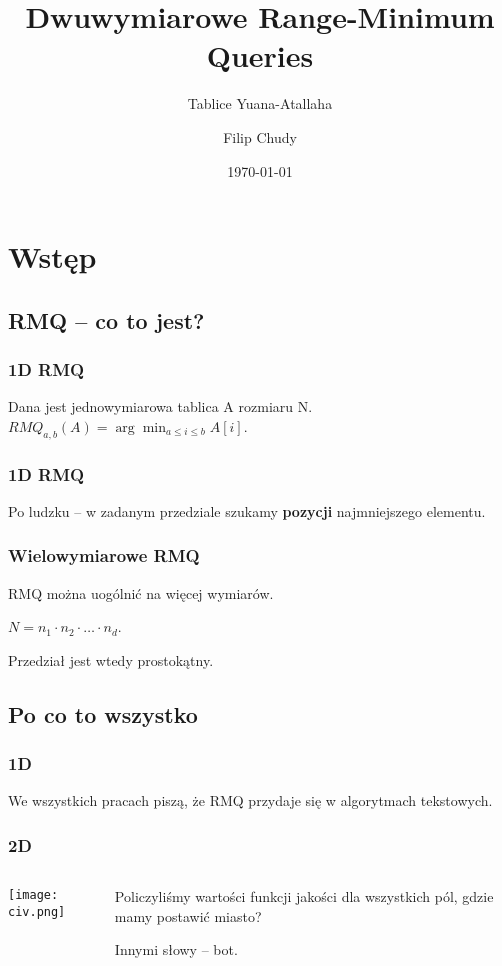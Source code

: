 \documentclass{beamer}
\begin{document}
\title{Dwuwymiarowe Range-Minimum Queries}
\subtitle{Tablice Yuana-Atallaha}
\author{Filip Chudy}
\date{\today}

\begin{frame}
\titlepage
\end{frame}

\section{Wstęp}
\subsection{RMQ -- co to jest?}
\begin{frame} \frametitle{1D RMQ}
 Dana jest jednowymiarowa tablica A rozmiaru N. $RMQ_{a,b}(A) = \arg\min_{a \leq i \leq b} A[i]$.
\end{frame}

\begin{frame} \frametitle{1D RMQ}
 Po ludzku -- w zadanym przedziale szukamy \textbf{pozycji} najmniejszego elementu.
\end{frame}

\begin{frame} \frametitle{Wielowymiarowe RMQ}
 RMQ można uogólnić na więcej wymiarów.
 
 $N = n_1 \cdot n_2 \cdot \dots \cdot n_d$.
 
 Przedział jest wtedy prostokątny.
\end{frame}

\subsection{Po co to wszystko}
\begin{frame} \frametitle{1D}
 We wszystkich pracach piszą, że RMQ przydaje się w algorytmach tekstowych.
\end{frame}

\begin{frame} \frametitle{2D}
\begin{columns}
\begin{column}{5cm}
\texttt{[image: civ.png]}
\end{column}
\begin{column}{5cm}
Policzyliśmy wartości funkcji jakości dla wszystkich pól, gdzie mamy postawić miasto?
 
 Innymi słowy -- bot.
\end{column} 
\end{columns} 
\end{frame}
\end{document}

